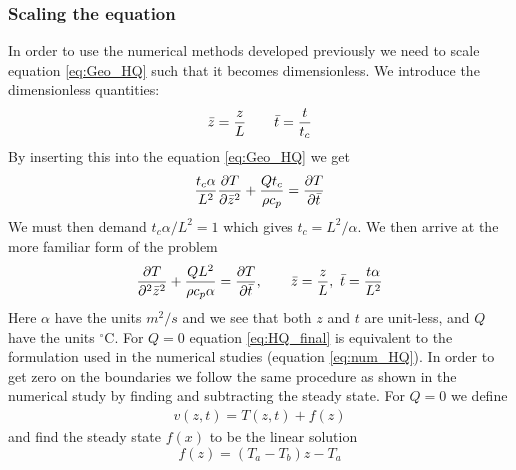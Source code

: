 \documentclass[%
 reprint,
nofootinbib,
aps,
]{revtex4-1}
\begin{document}
 \subsubsection{Scaling the equation }
 In order to use the numerical methods developed previously we need to scale equation \ref{eq:Geo_HQ} such that it becomes dimensionless.  We introduce the dimensionless quantities:
 \begin{align*}
     \Bar{z} = \frac{z}{L} \qquad \Bar{t} = \frac{t}{t_c}
 \end{align*}
 By inserting this into the equation \ref{eq:Geo_HQ} we get
 \begin{align*}
     \frac{t_c \alpha}{L^2} \frac{\partial T}{\partial \Bar{z}^2} + \frac{Q t_c}{\rho c_p} = \frac{\partial T}{\partial \Bar{t}}
 \end{align*}
 We must then demand $t_c \alpha/L^2 = 1$ which gives $t_c = L^2/\alpha$. We then arrive at the more familiar form of the problem
 \begin{equation}
    \frac{\partial T}{\partial^2 \Bar{z}^2} +  \frac{Q L^2}{\rho c_p \alpha} = \frac{\partial T}{\partial \Bar{t}}, \qquad \Bar{z} = \frac{z}{L}, \ \Bar{t} = \frac{t\alpha}{L^2}
    \label{eq:HQ_final}
 \end{equation}
 Here $\alpha$ have the units $m^2/s$ and we see that both $z$ and $t$ are unit-less, and $Q$ have the units $^{\circ}$C. For $Q = 0$ equation \ref{eq:HQ_final} is equivalent to the formulation used in the numerical studies (equation \ref{eq:num_HQ}). In order to get zero on the boundaries we follow the same procedure as shown in the numerical study by finding and subtracting the steady state. For $Q = 0$ we define
\begin{align*}
    v(z,t) = T(z,t) + f(z)
\end{align*}
and find the steady state $f(x)$ to be the linear solution
 \begin{equation}
     f(z) = (T_a - T_b)z - T_a
     \label{eq:SS_ana}
 \end{equation}
\end{document}

